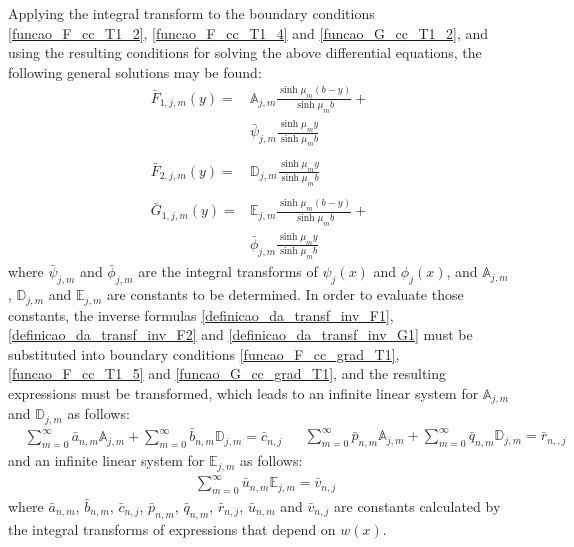 \documentclass[conference,compsoc,fleqn]{IEEEtran}
\begin{document}
Applying the integral transform to the boundary conditions \eqref{funcao_F_cc_T1_2}, \eqref{funcao_F_cc_T1_4} and \eqref{funcao_G_cc_T1_2}, and using the resulting conditions for solving the above differential equations, the following general solutions may be found\cite{livro_boyce}:
\begin{align}
\bar{F}_{1,j,m}(y) = & \mathbb{A}_{j,m} \frac{\sinh\mu_m (b - y)}{\sinh\mu_m b} + \nonumber \\
	& \bar{\psi}_{j, m}\frac{\sinh\mu_m y}{\sinh\mu_m b} \label{solucao_temporaria_F1} \\ \nonumber \\
\bar{F}_{2,j,m}(y) = & \mathbb{D}_{j,m}\frac{\sinh\mu_m y}{\sinh\mu_m b} \label{solucao_temporaria_F2} \\ \nonumber \\
\bar{G}_{1,j,m}(y) = & \mathbb{E}_{j,m} \frac{\sinh\mu_m (b - y)}{\sinh\mu_m b} + \nonumber \\
& \bar{\phi}_{j, m}\frac{\sinh\mu_m y}{\sinh\mu_m b} \label{solucao_temporaria_G1}
\end{align}
where $\bar{\psi}_{j, m}$ and $\bar{\phi}_{j, m}$ are the integral transforms of $\psi_j(x)$ and $\phi_j(x)$, and $\mathbb{A}_{j,m}$, $\mathbb{D}_{j,m}$ and $\mathbb{E}_{j,m}$ are constants to be determined. In order to evaluate those constants, the inverse formulas \eqref{definicao_da_transf_inv_F1}, \eqref{definicao_da_transf_inv_F2} and \eqref{definicao_da_transf_inv_G1} must be substituted into boundary conditions \eqref{funcao_F_cc_grad_T1}, \eqref{funcao_F_cc_T1_5} and \eqref{funcao_G_cc_grad_T1}, and the resulting expressions must be transformed, which leads to an infinite linear system for $\mathbb{A}_{j,m}$ and $\mathbb{D}_{j,m}$ as follows:
\begin{subequations}
\begin{align}
& \sum_{m = 0}^\infty \bar{a}_{n,m} \mathbb{A}_{j,m} + \sum_{m = 0}^\infty \bar{b}_{n,m} \mathbb{D}_{j,m} = \bar{c}_{n,j} \label{sistema_para_coeficientes_1}
\end{align}
\begin{align}
& \sum_{m = 0}^\infty \bar{p}_{n,m} \mathbb{A}_{j,m} + \sum_{m = 0}^\infty \bar{q}_{n,m} \mathbb{D}_{j,m} = \bar{r}_{n,,j} \label{sistema_para_coeficientes_2}
\end{align}
\end{subequations}
and an infinite linear system for $\mathbb{E}_{j,m}$ as follows:
\begin{align}
& \sum_{m = 0}^\infty \bar{u}_{n,m} \mathbb{E}_{j,m} = \bar{v}_{n,j} \label{sistema_para_coeficientes_3}
\end{align}
where $\bar{a}_{n,m}$, $\bar{b}_{n,m}$, $\bar{c}_{n,j}$, $\bar{p}_{n,m}$, $\bar{q}_{n,m}$, $\bar{r}_{n,j}$, $\bar{u}_{n,m}$ and $\bar{v}_{n,j}$ are constants calculated by the integral transforms of expressions that depend on $w(x)$.
\end{document}
